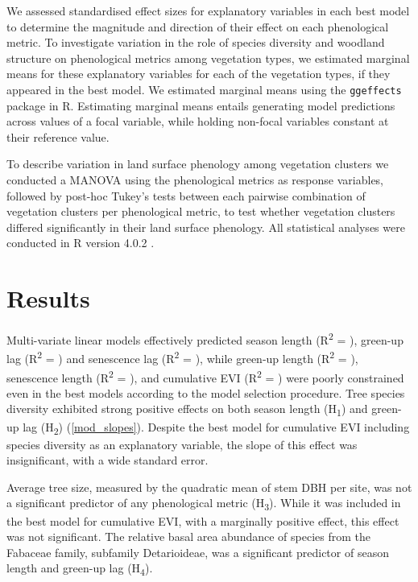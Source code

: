 \documentclass[11pt,a4paper]{article}
\begin{document}
We assessed standardised effect sizes for explanatory variables in each best model to determine the magnitude and direction of their effect on each phenological metric. To investigate variation in the role of species diversity and woodland structure on phenological metrics among vegetation types, we estimated marginal means for these explanatory variables for each of the vegetation types, if they appeared in the best model. We estimated marginal means using the \texttt{ggeffects} package in R. Estimating marginal means entails generating model predictions across values of a focal variable, while holding non-focal variables constant at their reference value.

To describe variation in land surface phenology among vegetation clusters we conducted a MANOVA using the phenological metrics as response variables, followed by post-hoc Tukey's tests between each pairwise combination of vegetation clusters per phenological metric, to test whether vegetation clusters differed significantly in their land surface phenology. All statistical analyses were conducted in R version 4.0.2 \citep{R2020}.

\section{Results}

Multi-variate linear models effectively predicted season length (R\textsuperscript{2} = \lengthRsq{}), green-up lag (R\textsuperscript{2} = \glagRsq{}) and senescence lag (R\textsuperscript{2} = \slagRsq{}), while green-up length (R\textsuperscript{2} = \grateRsq{}), senescence length (R\textsuperscript{2} = \srateRsq{}), and cumulative EVI (R\textsuperscript{2} = \cumviRsq{}) were poorly constrained even in the best models according to the model selection procedure. Tree species diversity exhibited strong positive effects on both season length (H\textsubscript{1}) and green-up lag (H\textsubscript{2}) (\autoref{mod_slopes}). Despite the best model for cumulative EVI including species diversity as an explanatory variable, the slope of this effect was insignificant, with a wide standard error.

Average tree size, measured by the quadratic mean of stem DBH per site, was not a significant predictor of any phenological metric (H\textsubscript{3}). While it was included in the best model for cumulative EVI, with a marginally positive effect, this effect was not significant. The relative basal area abundance of species from the Fabaceae family, subfamily Detarioideae, was a significant predictor of season length and green-up lag (H\textsubscript{4}).
\end{document}
